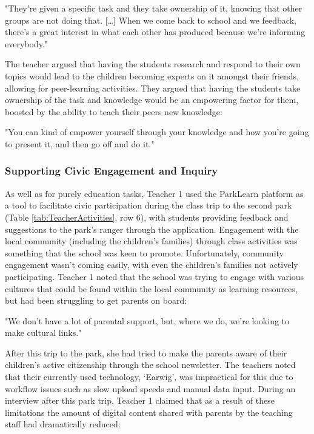 \begin{displayquote}
"They’re given a specific task and they take ownership of it, knowing that other groups are not doing that. […] When we come back to school and we feedback, there’s a great interest in what each other has produced because we’re informing everybody."
\end{displayquote}

The teacher argued that having the students research and respond to their own topics would lead to the children becoming experts on it amongst their friends, allowing for peer-learning activities. They argued that having the students take ownership of the task and knowledge would be an empowering factor for them, boosted by the ability to teach their peers new knowledge:

\begin{displayquote}
"You can kind of empower yourself through your knowledge and how you’re going to present it, and then go off and do it."
\end{displayquote}


\subsubsection{Supporting Civic Engagement and Inquiry}

As well as for purely education tasks, Teacher 1 used the ParkLearn platform as a tool to facilitate civic participation during the class trip to the second park (Table \ref{tab:TeacherActivities}, row 6), with students providing feedback and suggestions to the park's ranger through the application. Engagement with the local community (including the children's families) through class activities was something that the school was keen to promote. Unfortunately, community engagement wasn't coming easily, with even the children's families not actively participating. Teacher 1 noted that the school was trying to engage with various cultures that could be found within the local community as learning resources, but had been struggling to get parents on board: 

\begin{displayquote}
"We don’t have a lot of parental support, but, where we do, we’re looking to make cultural links."
\end{displayquote}

After this trip to the park, she had tried to make the parents aware of their children’s active citizenship through the school newsletter. The teachers noted that their currently used technology, `Earwig', was impractical for this due to workflow issues such as slow upload speeds and manual data input. During an interview after this park trip, Teacher 1 claimed that as a result of these limitations the amount of digital content shared with parents by the teaching staff had dramatically reduced:


